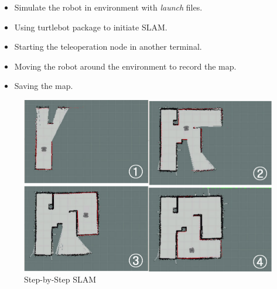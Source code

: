 \begin{itemize}
    \item Simulate the robot in environment with \textit{launch} files.
    \item Using turtlebot package to initiate SLAM.
    \item Starting the teleoperation node in another terminal.
    \item Moving the robot around the environment to record the map.
    \item Saving the map.
\end{itemize}

\begin{figure}[th]
    \centering
    \includegraphics[width=\textwidth]{Figures/SLAM.png}
    \decoRule
    \caption[]{Step-by-Step SLAM}
    \label{fig:Step-by-StepSLAM}
\end{figure}

